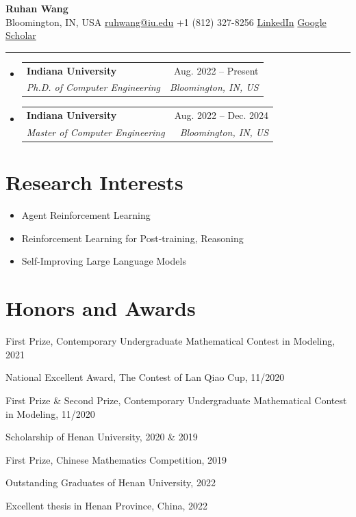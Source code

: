 \documentclass[letterpaper,10.8pt]{article}
\makeatletter
\newcommand{\resumeSubheading}[4]{
  \vspace{-1pt}\item
    \begin{tabular*}{0.97\textwidth}{l@{\extracolsep{\fill}}r}
      \textbf{#1} & #2 \\
      \textit{\small#3} & \textit{\small #4} \\
    \end{tabular*}\vspace{-5pt}
}
\newcommand{\resumeSubHeadingListStart}{\begin{itemize}[leftmargin=*]}
\newcommand{\resumeSubHeadingListEnd}{\end{itemize}}
\makeatother
\begin{document}
\begin{center}
  {\LARGE \textbf{Ruhan Wang}}\\[0.5em]

  \faMapMarker* \hspace{0.5em} Bloomington, IN, USA \quad
  \faEnvelope \hspace{0.5em} \href{mailto:ruhwang@iu.edu}{ruhwang@iu.edu} \quad
  \faPhone \hspace{0.5em} +1 (812) 327-8256 \quad
  \faLinkedin \hspace{0.5em} \href{https://www.linkedin.com/in/ruhan-wang-075922255/}{LinkedIn} \quad
  \faGraduationCap \hspace{0.5em} \href{https://scholar.google.com/citations?user=vHgJIPoAAAAJ&hl=en}{Google Scholar}

  \vspace{0.5em}
  \hrule
\end{center}%
\resumeSubHeadingListStart

    \resumeSubheading
        {Indiana University}{Aug. 2022 -- Present}
        {Ph.D. of Computer Engineering}{Bloomington, IN, US}
    \resumeSubheading
        {Indiana University}{Aug. 2022 -- Dec. 2024}
        {Master of Computer Engineering}{Bloomington, IN, US}
\resumeSubHeadingListEnd

\section{Research Interests}
\begin{itemize}[label=$\bullet$,leftmargin=*]
\setlength\itemsep{-0.1em}
\item Agent Reinforcement Learning
\item Reinforcement Learning for Post-training, Reasoning
\item Self-Improving Large Language Models
\end{itemize}

\section{Honors and Awards}
\begin{description}[font=$\bullet$,leftmargin=*]
\setlength\itemsep{-0.1em}
\item First Prize, Contemporary Undergraduate Mathematical Contest in Modeling, 2021 
\item National Excellent Award, The Contest of Lan Qiao Cup, 11/2020
\item First Prize \& Second Prize, Contemporary Undergraduate Mathematical Contest in Modeling, 11/2020
\item Scholarship of Henan University, 2020 \& 2019
\item First Prize, Chinese Mathematics Competition, 2019
\item Outstanding Graduates of Henan University, 2022
\item Excellent thesis in Henan Province, China, 2022
\end{description}
\end{document}
